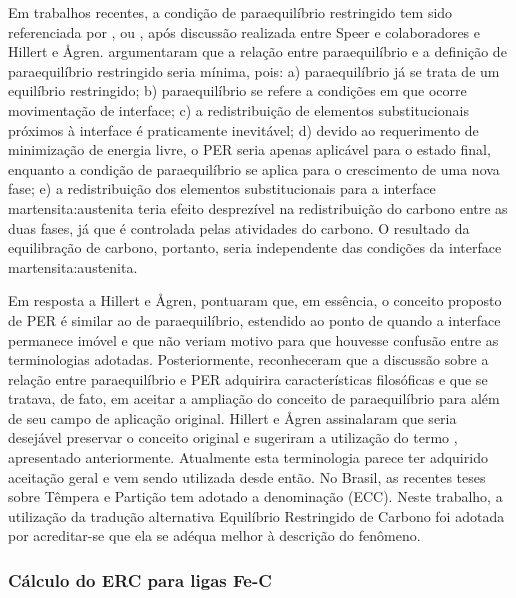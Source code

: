 Em trabalhos recentes, a condição de paraequilíbrio restringido tem sido referenciada por , ou , após discussão realizada entre Speer e colaboradores e Hillert e \AA gren\cite{Hillert2004a,Speer2005,Hillert2005}.  argumentaram que a relação entre paraequilíbrio e a definição de paraequilíbrio restringido seria mínima, pois: a) paraequilíbrio já se trata de um equilíbrio restringido; b) paraequilíbrio se refere a condições em que ocorre movimentação de interface; c) a redistribuição de elementos substitucionais próximos à interface é praticamente inevitável; d) devido ao requerimento de minimização de energia livre, o PER seria apenas aplicável para o estado final, enquanto a condição de paraequilíbrio se aplica para o crescimento de uma nova fase; e) a redistribuição dos elementos substitucionais para a interface martensita:austenita teria efeito desprezível na redistribuição do carbono entre as duas fases, já que é controlada pelas atividades do carbono. O resultado da equilibração de carbono, portanto, seria independente das condições da interface martensita:austenita.

Em resposta a Hillert e \AA gren,  pontuaram que, em essência, o conceito proposto de PER é similar ao de paraequilíbrio, estendido ao ponto de quando a interface permanece imóvel e que não veriam motivo para que houvesse confusão entre as terminologias adotadas. Posteriormente,  reconheceram que a discussão sobre a relação entre paraequilíbrio e PER adquirira características filosóficas e que se tratava, de fato, em aceitar a ampliação do conceito de paraequilíbrio para além de seu campo de aplicação original. Hillert e \AA gren assinalaram que seria desejável preservar o conceito original e sugeriram a utilização do termo , apresentado anteriormente. Atualmente esta terminologia parece ter adquirido aceitação geral e vem sendo utilizada desde então\cite{Edmonds2006, Speer2007}. No Brasil, as recentes teses sobre Têmpera e Partição tem adotado a denominação  (ECC)\cite{Martins2007, Coelho2008}. Neste trabalho, a utilização da tradução alternativa Equilíbrio Restringido de Carbono foi adotada por acreditar-se que ela se adéqua melhor à descrição do fenômeno.

\subsubsection{C\'{a}lculo do ERC para ligas Fe-C}

